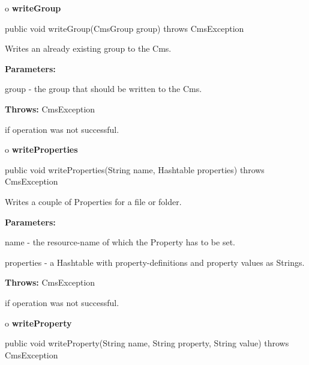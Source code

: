 o {\bf writeGroup} 

\begin{PRE}
 public void writeGroup(CmsGroup group) throws CmsException
\end{PRE}

\begin{description}
\htmlDD Writes an already existing group to the Cms. 

\begin{description}
\item {\bf Parameters:}  

group - the group that should be written to the Cms.  
\item {\bf Throws:} CmsException  

if operation was not successful.  
\end{description}

\end{description}

o {\bf writeProperties} 

\begin{PRE}
 public void writeProperties(String name,
                             Hashtable properties) throws CmsException
\end{PRE}

\begin{description}
\htmlDD Writes a couple of Properties for a file or folder. 

\begin{description}
\item {\bf Parameters:}  

name - the resource-name of which the Property has to be set.  

properties - a Hashtable with property-definitions and property values as
Strings.  
\item {\bf Throws:} CmsException  

if operation was not successful.  
\end{description}

\end{description}

o {\bf writeProperty} 

\begin{PRE}
 public void writeProperty(String name,
                           String property,
                           String value) throws CmsException
\end{PRE}


